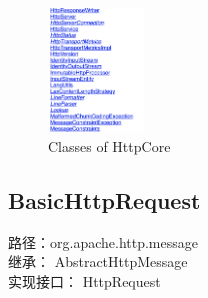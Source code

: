 \documentclass{article}
\begin{document}
\begin{figure}[htbp]
{\begin{minipage}[t]{0.45\linewidth}
				\centering
				\includegraphics[width = 1in]{pics/19_all_classes.png}
			\end{minipage}
		}%
		\quad
		\centering
		\caption{Classes of HttpCore}
	\end{figure}

	\subsection{BasicHttpRequest}
	\begin{CJK}{UTF8}{gbsn}
		路径：org.apache.http.message\\
		继承： AbstractHttpMessage\\
		实现接口： HttpRequest
	\end{CJK}{}
\end{document}

